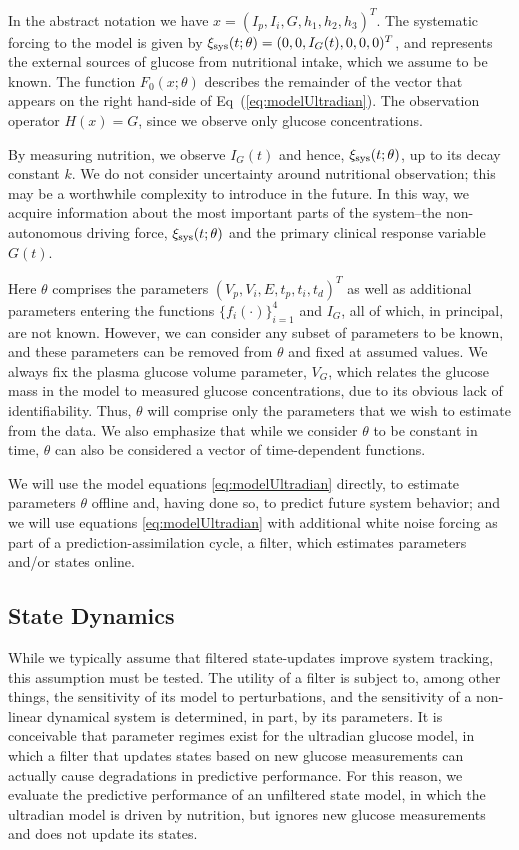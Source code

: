 \documentclass[10pt,letterpaper]{article}
\newcommand{\xis}{\xi_{\rm sys}}
\begin{document}
In the abstract notation we have $x=(I_p,I_i,G,h_1,h_2,h_3)^T$.
The systematic forcing to the model is given by 
$\xis(t;\theta)=(0,0,I_{G}(t),0,0,0)^T$,
and represents the external sources of glucose from nutritional intake, which we
assume to be known.
The function $F_0(x;\theta)$ describes the remainder of the vector that appears 
on the right hand-side of Eq~(\ref{eq:modelUltradian}). 
The observation operator $H(x)=G$, since we observe only glucose concentrations.

By measuring nutrition, we observe $I_{G}(t)$ and hence, $\xis(t;\theta)$, up to its decay constant $k$. We do not consider uncertainty around nutritional observation; this may be a worthwhile complexity to introduce in the future. In this way, we acquire information about the most important parts of the system--the non-autonomous driving force, $\xis(t;\theta)$ and the primary clinical response variable $G(t)$.


Here $\theta$
comprises the parameters $(V_p,V_i,E,t_p,t_i,t_d)^T$ as well as
additional parameters entering the functions $\{f_i(\cdot)\}_{i=1}^4$ and
$I_{G}$, all of which, in principal, are not known.
However, we can consider any subset of parameters to be known, and these parameters can be
removed from $\theta$ and fixed at assumed values. We always fix the plasma glucose volume parameter, $V_G$, which relates the glucose mass in the model to measured glucose concentrations, due to its obvious lack of identifiability.
Thus, $\theta$ will comprise only the parameters that we wish to estimate from the data.
We also emphasize that while we consider $\theta$ to be constant in time, $\theta$ can also be considered a vector of time-dependent functions. 

We will use the model equations \eqref{eq:modelUltradian} directly, 
to estimate parameters $\theta$ offline
and, having done so, to predict future system behavior; and we will use equations
\eqref{eq:modelUltradian} with additional white noise forcing 
as part of a prediction-assimilation cycle, a filter, 
which estimates parameters and/or states online.



\subsection{State Dynamics}
\label{sec:Unfiltered}
While we typically assume that filtered state-updates improve system tracking, this assumption must be tested. The utility of a filter is subject to, among other things, the sensitivity of its model to perturbations, and the sensitivity of a non-linear dynamical system is determined, in part, by its parameters. It is conceivable that parameter regimes exist for the ultradian glucose model, in which a filter that updates states based on new glucose measurements can actually cause degradations in predictive performance. For this reason, we evaluate the predictive performance of an unfiltered state model, in which the ultradian model is driven by nutrition, but ignores new glucose measurements and does not update its states. 
\end{document}
